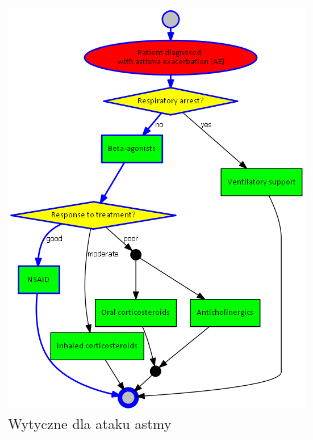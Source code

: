 \begin{figure}[H]
\centering
\includegraphics[width=0.7\textwidth]{img/asthma.png}
\caption{Wytyczne dla ataku astmy}
\label{fig:ag_ae}
\end{figure}

